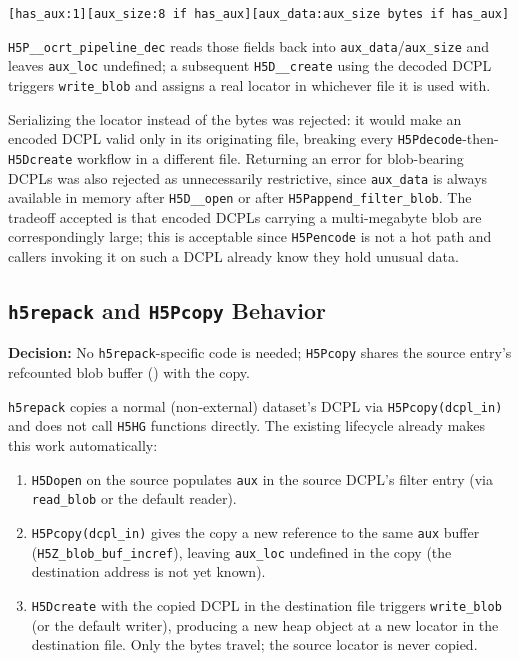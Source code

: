 \documentclass[../RFC-HDFG-2026-003.tex]{subfiles}
\begin{document}
\begin{center}
\texttt{[has\_aux:1][aux\_size:8 if has\_aux][aux\_data:aux\_size bytes if has\_aux]}
\end{center}

\texttt{H5P\_\_ocrt\_pipeline\_dec} reads those fields back into
\texttt{aux\_data}/\texttt{aux\_size} and leaves \texttt{aux\_loc}
undefined; a subsequent \texttt{H5D\_\_create} using the decoded DCPL
triggers \texttt{write\_blob} and assigns a real locator in whichever
file it is used with.

Serializing the locator instead of the bytes was rejected: it would make
an encoded DCPL valid only in its originating file, breaking every
\texttt{H5Pdecode}-then-\texttt{H5Dcreate} workflow in a different file.
Returning an error for blob-bearing DCPLs was also rejected as
unnecessarily restrictive, since \texttt{aux\_data} is always available
in memory after \texttt{H5D\_\_open} or after
\texttt{H5Pappend\_filter\_blob}. The tradeoff accepted is that encoded
DCPLs carrying a multi-megabyte blob are correspondingly large; this is
acceptable since \texttt{H5Pencode} is not a hot path and callers
invoking it on such a DCPL already know they hold unusual data.

\subsection{\texttt{h5repack} and \texttt{H5Pcopy} Behavior}
\label{sec:blob-repack}

\noindent\textbf{Decision:} No \texttt{h5repack}-specific code is
needed; \texttt{H5Pcopy} shares the source entry's refcounted blob
buffer () with the copy.

\texttt{h5repack} copies a normal (non-external) dataset's DCPL via
\texttt{H5Pcopy(dcpl\_in)} and does not call \texttt{H5HG} functions
directly. The existing lifecycle already makes this work automatically:

\begin{enumerate}
\item \texttt{H5Dopen} on the source populates \texttt{aux} in the
  source DCPL's filter entry (via \texttt{read\_blob} or the default
  reader).
\item \texttt{H5Pcopy(dcpl\_in)} gives the copy a new reference to the
  same \texttt{aux} buffer (\texttt{H5Z\_blob\_buf\_incref}), leaving
  \texttt{aux\_loc} undefined in the copy (the destination address is
  not yet known).
\item \texttt{H5Dcreate} with the copied DCPL in the destination file
  triggers \texttt{write\_blob} (or the default writer), producing a new
  heap object at a new locator in the destination file. Only the bytes
  travel; the source locator is never copied.
\end{enumerate}
\end{document}
